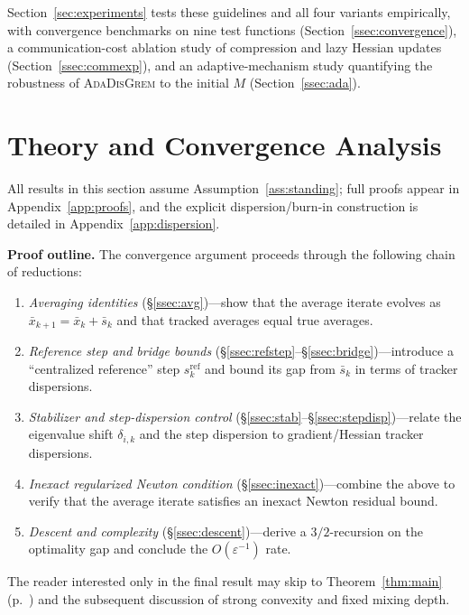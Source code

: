 \documentclass[10pt,twocolumn,letterpaper]{article}
\def\cO{O}%
\theoremstyle{compact}
\theoremstyle{compactremark}
\newcommand{\cO}{\mathcal{O}}
\begin{document}
	\noindent
	Section~\ref{sec:experiments} tests these guidelines and all four
	variants empirically, with convergence benchmarks on nine test functions
	(Section~\ref{ssec:convergence}), a communication-cost ablation study
	of compression and lazy Hessian updates (Section~\ref{ssec:commexp}),
	and an adaptive-mechanism study quantifying the robustness of
	\textsc{AdaDisGrem} to the initial $M$ (Section~\ref{ssec:ada}).
	
	
\section{Theory and Convergence Analysis}\label{sec:theory}
All results in this section assume Assumption~\ref{ass:standing};
full proofs appear in Appendix~\ref{app:proofs}, and the explicit
dispersion/burn-in construction is detailed in
Appendix~\ref{app:dispersion}.

\noindent\textbf{Proof outline.}
The convergence argument proceeds through the following chain of
reductions:
\begin{enumerate}[leftmargin=1.8em,itemsep=1pt,label=\textbf{(\roman*)}]
	\item \emph{Averaging identities}
	  (\S\ref{ssec:avg})---show that the average iterate evolves as
	  $\bar x_{k+1}=\bar x_k+\bar s_k$ and that tracked averages
	  equal true averages.
	\item \emph{Reference step and bridge bounds}
	  (\S\ref{ssec:refstep}--\S\ref{ssec:bridge})---introduce a
	  ``centralized reference'' step $s_k^{\mathrm{ref}}$ and bound
	  its gap from $\bar s_k$ in terms of tracker dispersions.
	\item \emph{Stabilizer and step-dispersion control}
	  (\S\ref{ssec:stab}--\S\ref{ssec:stepdisp})---relate the
	  eigenvalue shift $\delta_{i,k}$ and the step dispersion to
	  gradient/Hessian tracker dispersions.
	\item \emph{Inexact regularized Newton condition}
	  (\S\ref{ssec:inexact})---combine the above to verify that the
	  average iterate satisfies an inexact Newton residual bound.
	\item \emph{Descent and complexity}
	  (\S\ref{ssec:descent})---derive a $3/2$-recursion on the
	  optimality gap and conclude the $\cO(\varepsilon^{-1})$ rate.
\end{enumerate}
The reader interested only in the final result may skip to
Theorem~\ref{thm:main} (p.~\pageref{thm:main}) and the subsequent
discussion of strong convexity and fixed mixing depth.
\end{document}
